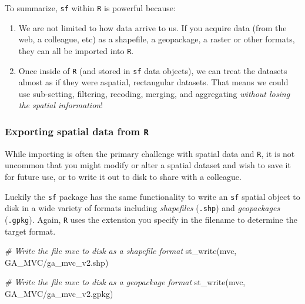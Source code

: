 \documentclass[
]{book}
\newenvironment{Shaded}{\begin{snugshade}}{\end{snugshade}}
\newcommand{\CommentTok}[1]{\textcolor[rgb]{0.56,0.35,0.01}{\textit{#1}}}
\newcommand{\FunctionTok}[1]{\textcolor[rgb]{0.00,0.00,0.00}{#1}}
\newcommand{\NormalTok}[1]{#1}
\newcommand{\StringTok}[1]{\textcolor[rgb]{0.31,0.60,0.02}{#1}}
\providecommand{\tightlist}{%
  \setlength{\itemsep}{0pt}\setlength{\parskip}{0pt}}
\newenvironment{rmdnote}[1]
  {
  \begin{itemize}
  \renewcommand{\labelitemi}{
    \raisebox{-.7\height}[0pt][0pt]{
      {\setkeys{Gin}{width=3em,keepaspectratio}\texttt{[image: images/\#1]}}
    }
  }
  \setlength{\fboxsep}{1em}
  \begin{note}
  \item
  }
  {
  \end{note}
  \end{itemize}
  }
\begin{document}
\begin{rmdnote}{note}

To summarize, \texttt{sf} within \texttt{R} is powerful because:

\begin{enumerate}
\def\labelenumi{\arabic{enumi}.}
\tightlist
\item
  We are not limited to how data arrive to us. If you acquire data (from the web, a colleague, etc) as a shapefile, a geopackage, a raster or other formats, they can all be imported into \texttt{R}.
\item
  Once inside of \texttt{R} (and stored in \texttt{sf} data objects), we can treat the datasets almost as if they were aspatial, rectangular datasets. That means we could use sub-setting, filtering, recoding, merging, and aggregating \emph{without losing the spatial information}!
\end{enumerate}

\end{rmdnote}

\hypertarget{exporting-spatial-data-from-r}{%
\subsubsection{\texorpdfstring{Exporting spatial data from \texttt{R}}{Exporting spatial data from R}}\label{exporting-spatial-data-from-r}}

While importing is often the primary challenge with spatial data and \texttt{R}, it is not uncommon that you might modify or alter a spatial dataset and wish to save it for future use, or to write it out to disk to share with a colleague.

Luckily the \texttt{sf} package has the same functionality to write an \texttt{sf} spatial object to disk in a wide variety of formats including \emph{shapefiles} (\texttt{.shp}) and \emph{geopackages} (\texttt{.gpkg}). Again, \texttt{R} uses the extension you specify in the filename to determine the target format.

\begin{Shaded}
\begin{Highlighting}[]
\CommentTok{\# Write the file mvc to disk as a shapefile format}
\FunctionTok{st\_write}\NormalTok{(mvc, }\StringTok{\textquotesingle{}GA\_MVC/ga\_mvc\_v2.shp\textquotesingle{}}\NormalTok{)}

\CommentTok{\# Write the file mvc to disk as a geopackage format}
\FunctionTok{st\_write}\NormalTok{(mvc, }\StringTok{\textquotesingle{}GA\_MVC/ga\_mvc\_v2.gpkg\textquotesingle{}}\NormalTok{)}
\end{Highlighting}
\end{Shaded}
\end{document}
